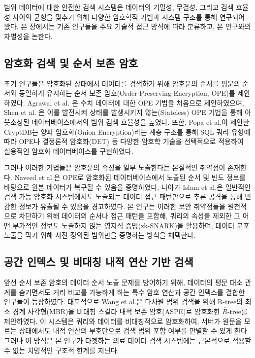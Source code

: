 
범위 데이터에 대한 안전한 검색 시스템은 데이터의 기밀성, 무결성, 그리고 검색 효율성 사이의 균형을 맞추기 위해 다양한 암호학적 기법과 시스템 구조를 통해 연구되어 왔다. 본 장에서는 기존 연구들을 주요 기술적 접근 방식에 따라 분류하고, 본 연구와의 차별성을 논한다.

\subsection{암호화 검색 및 순서 보존 암호}
초기 연구들은 암호화된 상태에서 데이터를 검색하기 위해 암호문의 순서를 평문의 순서와 동일하게 유지하는 순서 보존 암호(Order-Preserving Encryption, OPE)를 제안하였다. Agrawal et al. \cite{agrawal2004}은 수치 데이터에 대한 OPE 기법을 처음으로 제안하였으며, Shen et al. \cite{shen2021}은 이를 발전시켜 상태를 발생시키지 않는(Stateless) OPE 기법을 통해 아웃소싱된 데이터베이스에서의 범위 검색 효율성을 높였다. 또한, Popa et al.\cite{popa2011}이 제안한 CryptDB는 양파 암호화(Onion Encryption)라는 계층 구조를 통해 SQL 쿼리 유형에 따라 OPE나 결정론적 암호화(DET) 등 다양한 암호학 기술을 선택적으로 적용하여 실용적인 암호화 데이터베이스를 구현하였다. 

\bigskip

그러나 이러한 기법들은 암호문의 속성을 일부 노출한다는 본질적인 취약점이 존재한다. Naveed et al.\cite{naveed2015}은 OPE로 암호화된 데이터베이스에서 노출된 순서 및 빈도 정보를 바탕으로 원본 데이터가 복구될 수 있음을 증명하였다. 나아가 Islam et al.\cite{islam2012}은 일반적인 검색 가능 암호화 시스템에서도 노출되는 데이터 접근 패턴만으로 추론 공격을 통해 민감한 정보가 유출될 수 있음을 경고하였다. 본 연구는 이러한 보안 취약점들을 원천적으로 차단하기 위해 데이터의 순서나 접근 패턴을 포함해, 쿼리의 속성을 제외한 그 어떤 부가적인 정보도 노출하지 않는 영지식 증명(zk-SNARK)을 활용하며, 데이터 분포 노출을 막기 위해 사전 정의된 범위만을 증명하는 방식을 채택한다.

\subsection{공간 인덱스 및 비대칭 내적 연산 기반 검색}
앞선 순서 보존 암호의 데이터 순서 노출 문제를 방어하기 위해, 데이터의 평문 대소 관계를 숨기면서도 거리 비교를 가능하게 하는 특수 암호 연산과 공간 인덱스를 결합한 연구들이 등장하였다. 대표적으로 Wang et al.\cite{wang2013}은 다차원 범위 검색을 위해 R-tree의 최소 경계 사각형(MBR)을 비대칭 스칼라 내적 보존 암호(ASPE)로 암호화한 $\hat{R}$-tree를 제안하였다. 이 시스템은 쿼리와 데이터를 비대칭적으로 암호화하여, 서버가 원문을 모르는 상태에서도 내적 연산의 부호만으로 검색 범위 포함 여부를 판별할 수 있게 한다. 그러나 이 방식은 본 연구가 타겟하는 의료 데이터 검색 시스템에는 근본적으로 적용할 수 없는 치명적인 구조적 한계를 지닌다.


